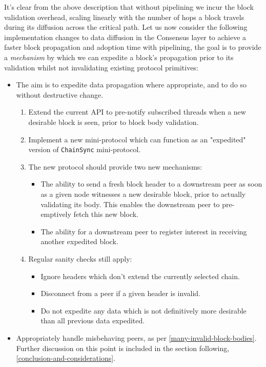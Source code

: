 \documentclass[11pt,a4paper]{article}
\begin{document}
It's clear from the above description that without pipelining we incur the block validation overhead,
scaling linearly with the number of hops a block travels during its diffusion across the critical path.
Let us now consider the following implementation changes to data diffusion in the Consensus layer to achieve
a faster block propagation and adoption time with pipelining, the goal is to provide a \emph{mechanism} by which we 
can expedite a block's propagation prior to its validation whilst not invalidating existing protocol primitives:

\begin{itemize}
  \item The aim is to expedite data propagation where appropriate, and to do so without destructive change.
  \begin{enumerate}
    \item Extend the current API to pre-notify subscribed threads when a new desirable block is seen, prior to block body validation.
    \item Implement a new mini-protocol which can function as an "expedited" version of \lstinline{ChainSync} mini-protocol.
    \item The new protocol should provide two new mechanisms:
    \begin{itemize}
      \item The ability to send a fresh block header to a downstream peer as soon as a given node witnesses a new desirable block, prior to actually validating its body. This enables the downstream peer to pre-emptively fetch this new block.
      \item The ability for a downstream peer to register interest in receiving another expedited block. 
    \end{itemize}
    \item Regular sanity checks still apply:
    \begin{itemize}
      \item Ignore headers which don't extend the currently selected chain.
      \item Disconnect from a peer if a given header is invalid.
      \item Do not expedite any data which is not definitively more desirable than all previous data expedited. 
    \end{itemize} 
  \end{enumerate}
  \item Appropriately handle misbehaving peers, as per \cref{many-invalid-block-bodies}. Further discussion on this point is included in the section following, \cref{conclusion-and-considerations}.
\end{itemize}
  
\end{document}
